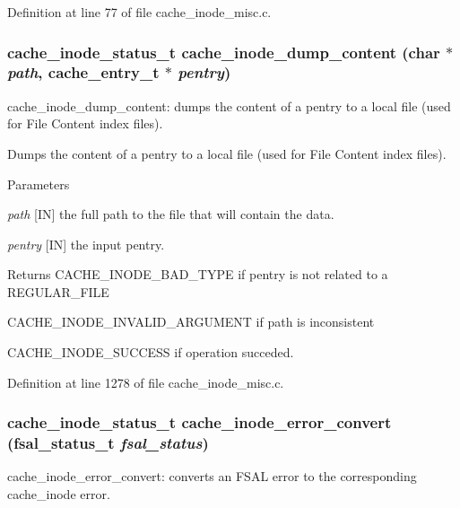 Definition at line 77 of file cache\_\-inode\_\-misc.c.
\subsubsection[{cache\_\-inode\_\-dump\_\-content}]{\setlength{\rightskip}{0pt plus 5cm}cache\_\-inode\_\-status\_\-t cache\_\-inode\_\-dump\_\-content (char $\ast$ {\em path}, \/  cache\_\-entry\_\-t $\ast$ {\em pentry})}\label{cache__inode__misc_8c_ad4bd35e3d32d663afea3499d1a29199e}
cache\_\-inode\_\-dump\_\-content: dumps the content of a pentry to a local file (used for File Content index files).

Dumps the content of a pentry to a local file (used for File Content index files).


\begin{DoxyParams}{Parameters}
\item[{\em path}][IN] the full path to the file that will contain the data. \item[{\em pentry}][IN] the input pentry.\end{DoxyParams}
\begin{DoxyReturn}{Returns}
CACHE\_\-INODE\_\-BAD\_\-TYPE if pentry is not related to a REGULAR\_\-FILE \par
 

CACHE\_\-INODE\_\-INVALID\_\-ARGUMENT if path is inconsistent \par
 

CACHE\_\-INODE\_\-SUCCESS if operation succeded. 
\end{DoxyReturn}


Definition at line 1278 of file cache\_\-inode\_\-misc.c.
\subsubsection[{cache\_\-inode\_\-error\_\-convert}]{\setlength{\rightskip}{0pt plus 5cm}cache\_\-inode\_\-status\_\-t cache\_\-inode\_\-error\_\-convert (fsal\_\-status\_\-t {\em fsal\_\-status})}\label{cache__inode__misc_8c_aaa50487b9b403fd85b4a845de1a3df69}
cache\_\-inode\_\-error\_\-convert: converts an FSAL error to the corresponding cache\_\-inode error.

